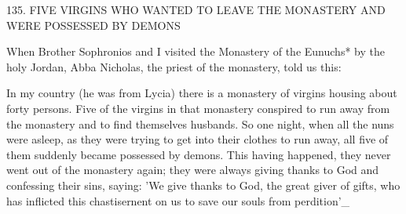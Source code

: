 135.
FIVE VIRGINS WHO WANTED TO LEAVE
THE MONASTERY AND WERE POSSESSED
BY DEMONS

When Brother Sophronios and I visited the Monastery of the
Eunuchs* by the holy Jordan, Abba Nicholas, the priest of the
monastery, told us this:

In my country (he was from Lycia) there is a monastery of virgins
housing about forty persons.
Five of the virgins in that monastery
conspired to run away from the monastery and to find themselves
husbands.
So one night, when all the nuns were asleep, as they were
trying to get into their clothes to run away, all five of them
suddenly became possessed by demons.
This having happened, they
never went out of the monastery again; they were always giving
thanks to God and confessing their sins, saying: 'We give thanks to
God, the great giver of gifts, who has inflicted this chastisernent on
us to save our souls from perdition'\_

